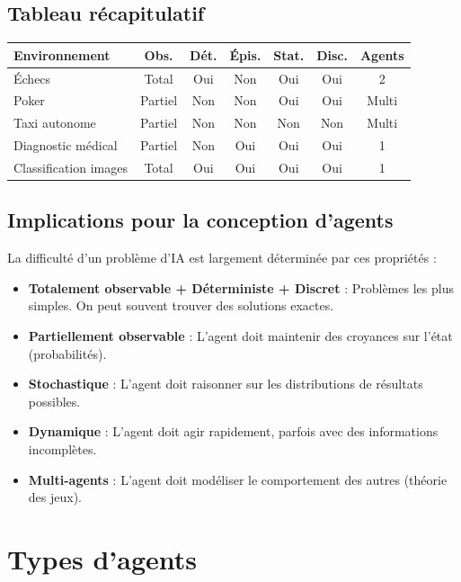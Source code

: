 \documentclass[11pt,a4paper]{article}
\begin{document}
\subsection{Tableau récapitulatif}

\begin{center}
\begin{tabular}{|l|c|c|c|c|c|c|}
\hline
\textbf{Environnement} & \textbf{Obs.} & \textbf{Dét.} & \textbf{Épis.} & \textbf{Stat.} & \textbf{Disc.} & \textbf{Agents} \\
\hline
Échecs & Total & Oui & Non & Oui & Oui & 2 \\
Poker & Partiel & Non & Non & Oui & Oui & Multi \\
Taxi autonome & Partiel & Non & Non & Non & Non & Multi \\
Diagnostic médical & Partiel & Non & Oui & Oui & Oui & 1 \\
Classification images & Total & Oui & Oui & Oui & Oui & 1 \\
\hline
\end{tabular}
\end{center}

\subsection{Implications pour la conception d'agents}

La difficulté d'un problème d'IA est largement déterminée par ces propriétés :

\begin{itemize}
    \item \textbf{Totalement observable + Déterministe + Discret} : Problèmes les plus simples. On peut souvent trouver des solutions exactes.
    \item \textbf{Partiellement observable} : L'agent doit maintenir des croyances sur l'état (probabilités).
    \item \textbf{Stochastique} : L'agent doit raisonner sur les distributions de résultats possibles.
    \item \textbf{Dynamique} : L'agent doit agir rapidement, parfois avec des informations incomplètes.
    \item \textbf{Multi-agents} : L'agent doit modéliser le comportement des autres (théorie des jeux).
\end{itemize}

\section{Types d'agents}
\end{document}
